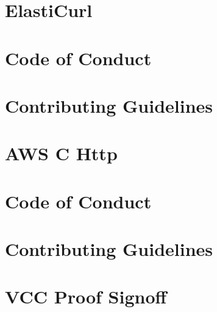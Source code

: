 \documentclass[twoside]{book}
\newcommand{\+}{\discretionary{\mbox{\scriptsize$\hookleftarrow$}}{}{}}
\begin{document}
\chapter{Elasti\+Curl}
\label{md_crt_aws_crt_cpp_crt_aws_c_http_bin_elasticurl__r_e_a_d_m_e}

\chapter{Code of Conduct}
\label{md_crt_aws_crt_cpp_crt_aws_c_http__c_o_d_e__o_f__c_o_n_d_u_c_t}

\chapter{Contributing Guidelines}
\label{md_crt_aws_crt_cpp_crt_aws_c_http__c_o_n_t_r_i_b_u_t_i_n_g}

\chapter{AWS C Http}
\label{md_crt_aws_crt_cpp_crt_aws_c_http__r_e_a_d_m_e}

\chapter{Code of Conduct}
\label{md_crt_aws_crt_cpp_crt_aws_c_io__c_o_d_e__o_f__c_o_n_d_u_c_t}

\chapter{Contributing Guidelines}
\label{md_crt_aws_crt_cpp_crt_aws_c_io__c_o_n_t_r_i_b_u_t_i_n_g}

\chapter{VCC Proof Signoff}
\label{md_crt_aws_crt_cpp_crt_aws_c_io_docs_epoll_event_loop_proof}

\end{document}

